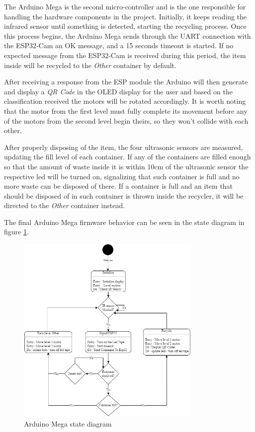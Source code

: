 \documentclass[a4paper,11pt]{article}
\begin{document}
The Arduino Mega is the second micro-controller and is the one responsible for handling the hardware components in the project. Initially, it keeps reading the infrared sensor until something is detected, starting the recycling process. Once this process begins, the Arduino Mega sends through the UART connection with the ESP32-Cam an OK message, and a 15 seconds timeout is started. If no expected message from the ESP32-Cam is received during this period, the item inside will be recycled to the \textit{Other} container by default.

After receiving a response from the ESP module the Arduino will then generate and display a \textit{QR Code} in the OLED display for the user and based on the classification received the motors will be rotated accordingly. It is worth noting that the motor from the first level must fully complete its movement before any of the motors from the second level begin theirs, so they won't collide with each other.

After properly disposing of the item, the four ultrasonic sensors are measured, updating the fill level of each container. If any of the containers are filled enough so that the amount of waste inside it is within 10cm of the ultrasonic sensor the respective led will be turned on, signalizing that such container is full and no more waste can be disposed of there. If a container is full and an item that should be disposed of in such container is thrown inside the recycler, it will be directed to the \textit{Other} container instead.

The final Arduino Mega firmware behavior can be seen in the state diagram in figure \ref{fig:arduinoState}.

\begin{figure}[H]
  \centering
  \includegraphics[width=8.9cm]{Figures/State chart Arduino Mega.png}
  \caption{\small{Arduino Mega state diagram}}
  \label{fig:arduinoState}
\end{figure}
\end{document}
